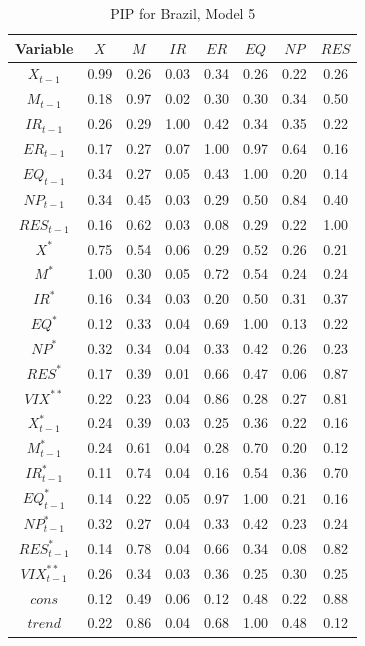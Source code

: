 \documentclass[a4paper, twoside]{templates/ociamthesis}
\begin{document}
\begin{table}[!ht]

\caption{\label{tab:TablePIPBR5}PIP for Brazil, Model 5}
\centering
\fontsize{8}{10}\selectfont
\begin{tabular}[t]{cccccccc}
\toprule
Variable & $X$ & $M$ & $IR$ & $ER$ & $EQ$ & $NP$ & $RES$\\
\midrule
$X_{t-1}$ & 0.99 & 0.26 & 0.03 & 0.34 & 0.26 & 0.22 & 0.26\\
$M_{t-1}$ & 0.18 & 0.97 & 0.02 & 0.30 & 0.30 & 0.34 & 0.50\\
$IR_{t-1}$ & 0.26 & 0.29 & 1.00 & 0.42 & 0.34 & 0.35 & 0.22\\
$ER_{t-1}$ & 0.17 & 0.27 & 0.07 & 1.00 & 0.97 & 0.64 & 0.16\\
$EQ_{t-1}$ & 0.34 & 0.27 & 0.05 & 0.43 & 1.00 & 0.20 & 0.14\\
$NP_{t-1}$ & 0.34 & 0.45 & 0.03 & 0.29 & 0.50 & 0.84 & 0.40\\
$RES_{t-1}$ & 0.16 & 0.62 & 0.03 & 0.08 & 0.29 & 0.22 & 1.00\\
$X^*$ & 0.75 & 0.54 & 0.06 & 0.29 & 0.52 & 0.26 & 0.21\\
$M^*$ & 1.00 & 0.30 & 0.05 & 0.72 & 0.54 & 0.24 & 0.24\\
$IR^*$ & 0.16 & 0.34 & 0.03 & 0.20 & 0.50 & 0.31 & 0.37\\
$EQ^*$ & 0.12 & 0.33 & 0.04 & 0.69 & 1.00 & 0.13 & 0.22\\
$NP^*$ & 0.32 & 0.34 & 0.04 & 0.33 & 0.42 & 0.26 & 0.23\\
$RES^*$ & 0.17 & 0.39 & 0.01 & 0.66 & 0.47 & 0.06 & 0.87\\
$VIX^{**}$ & 0.22 & 0.23 & 0.04 & 0.86 & 0.28 & 0.27 & 0.81\\
$X^*_{t-1}$ & 0.24 & 0.39 & 0.03 & 0.25 & 0.36 & 0.22 & 0.16\\
$M^*_{t-1}$ & 0.24 & 0.61 & 0.04 & 0.28 & 0.70 & 0.20 & 0.12\\
$IR^*_{t-1}$ & 0.11 & 0.74 & 0.04 & 0.16 & 0.54 & 0.36 & 0.70\\
$EQ^*_{t-1}$ & 0.14 & 0.22 & 0.05 & 0.97 & 1.00 & 0.21 & 0.16\\
$NP^*_{t-1}$ & 0.32 & 0.27 & 0.04 & 0.33 & 0.42 & 0.23 & 0.24\\
$RES^*_{t-1}$ & 0.14 & 0.78 & 0.04 & 0.66 & 0.34 & 0.08 & 0.82\\
$VIX^{**}_{t-1}$ & 0.26 & 0.34 & 0.03 & 0.36 & 0.25 & 0.30 & 0.25\\
$cons$ & 0.12 & 0.49 & 0.06 & 0.12 & 0.48 & 0.22 & 0.88\\
$trend$ & 0.22 & 0.86 & 0.04 & 0.68 & 1.00 & 0.48 & 0.12\\
\bottomrule
\end{tabular}
\end{table}
\end{document}

